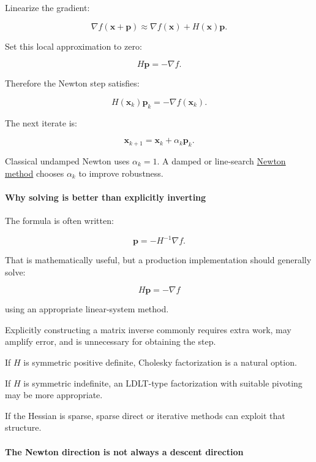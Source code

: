Linearize the gradient:

\[
\nabla f(\mathbf x+\mathbf p) \approx \nabla f(\mathbf x)+H(\mathbf x)\mathbf p.
\]

Set this local approximation to zero:

\[
H\mathbf p=-\nabla f.
\]

Therefore the Newton step satisfies:

\[
\boxed{ H(\mathbf x_k)\mathbf p_k=-\nabla f(\mathbf x_k) }.
\]

The next iterate is:

\[
\mathbf x_{k+1}=\mathbf x_k+\alpha_k\mathbf p_k.
\]

Classical undamped Newton uses \(\alpha_k=1\). A damped or line-search \hyperref[02-foundations-ii-ch026-optimization-and-inverse-problems]{Newton method} chooses \(\alpha_k\) to improve robustness.

\paragraph{Why solving is better than explicitly inverting}\label{02-foundations-ii-ch026-why-solving-is-better-than-explicitly-inverting}

\hypertarget{02-foundations-ii-ch026-why-solving-is-better-than-explicitly-inverting}{}

The formula is often written:

\[
\mathbf p=-H^{-1}\nabla f.
\]

That is mathematically useful, but a production implementation should generally solve:

\[
H\mathbf p=-\nabla f
\]

using an appropriate linear-system method.

Explicitly constructing a matrix inverse commonly requires extra work, may amplify error, and is unnecessary for obtaining the step.

If \(H\) is symmetric positive definite, Cholesky factorization is a natural option.

If \(H\) is symmetric indefinite, an LDLT-type factorization with suitable pivoting may be more appropriate.

If the Hessian is sparse, sparse direct or iterative methods can exploit that structure.

\paragraph{The Newton direction is not always a descent direction}\label{02-foundations-ii-ch026-the-newton-direction-is-not-always-a-descent-direction}

